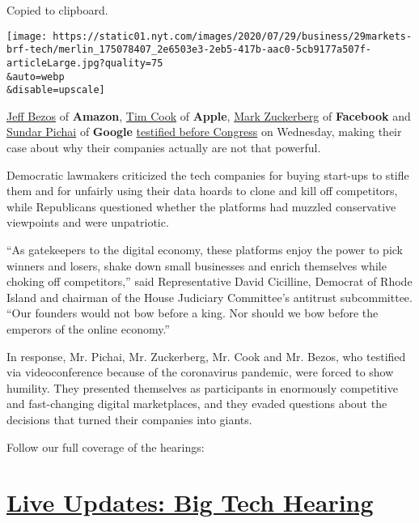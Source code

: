 Copied to clipboard.

\texttt{[image: https://static01.nyt.com/images/2020/07/29/business/29markets-brf-tech/merlin\_175078407\_2e6503e3-2eb5-417b-aac0-5cb9177a507f-articleLarge.jpg?quality=75\\\&auto=webp\\\&disable=upscale]}

\href{https://www.nytimes.com/2020/07/27/business/jeff-bezos-amazon-congress.html}{Jeff
Bezos} of \textbf{Amazon},
\href{https://www.nytimes.com/2014/06/15/technology/tim-cook-making-apple-his-own.html}{Tim
Cook} of \textbf{Apple},
\href{https://www.nytimes.com/2018/03/21/technology/mark-zuckerberg-q-and-a.html}{Mark
Zuckerberg} of \textbf{Facebook} and
\href{https://www.nytimes.com/2019/12/03/technology/google-alphabet-ceo-larry-page-sundar-pichai.html}{Sundar
Pichai} of \textbf{Google}
\href{https://www.nytimes.com/live/2020/07/29/technology/tech-ceos-hearing-testimony}{testified
before Congress} on Wednesday, making their case about why their
companies actually are not that powerful.

Democratic lawmakers criticized the tech companies for buying start-ups
to stifle them and for unfairly using their data hoards to clone and
kill off competitors, while Republicans questioned whether the platforms
had muzzled conservative viewpoints and were unpatriotic.

``As gatekeepers to the digital economy, these platforms enjoy the power
to pick winners and losers, shake down small businesses and enrich
themselves while choking off competitors,'' said Representative David
Cicilline, Democrat of Rhode Island and chairman of the House Judiciary
Committee's antitrust subcommittee. ``Our founders would not bow before
a king. Nor should we bow before the emperors of the online economy.''

In response, Mr. Pichai, Mr. Zuckerberg, Mr. Cook and Mr. Bezos, who
testified via videoconference because of the coronavirus pandemic, were
forced to show humility. They presented themselves as participants in
enormously competitive and fast-changing digital marketplaces, and they
evaded questions about the decisions that turned their companies into
giants.

Follow our full coverage of the hearings:

\hypertarget{live-updates-big-tech-hearing}{%
\section{\texorpdfstring{\href{https://www.nytimes.com/live/2020/07/29/technology/tech-ceos-hearing-testimony}{Live
Updates: Big Tech
Hearing}}{Live Updates: Big Tech Hearing}}\label{live-updates-big-tech-hearing}}

